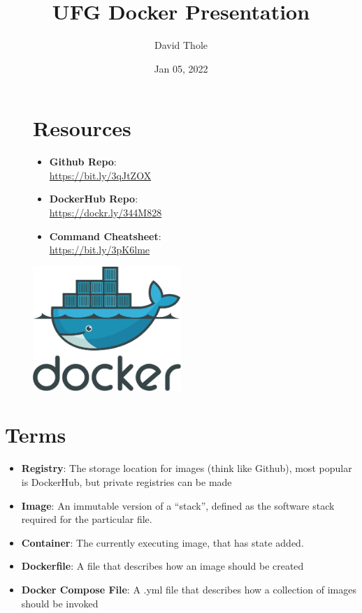 \documentclass[legal,12pt,oneside,pdflatex,final,twocolumn]{article}
\title{UFG Docker Presentation}
\author{David Thole}
\date{Jan 05, 2022}
\begin{document}
\pagestyle{fancy}


\onecolumn

\begin{figure}
\begin{minipage}{0.47\textwidth}
\section{Resources}
    \begin{itemize}
        \item \textbf{Github Repo}: \\ \url{https://bit.ly/3qJtZOX}
        \item \textbf{DockerHub Repo}: \\ \url{https://dockr.ly/344M828}
        \item \textbf{Command Cheatsheet}: \\ \url{https://bit.ly/3pK6lme}
    \end{itemize}
\end{minipage}
\hfill
\begin{minipage}{0.47\textwidth}
  \centering
  \includegraphics[width=0.5\textwidth,right]{XX-DockerLogo.png}
\end{minipage}
\end{figure}

\section{Terms}
\begin{itemize}
  \item \textbf{Registry}: The storage location for images (think like Github), most popular is DockerHub, but private registries can be made
  \item \textbf{Image}: An immutable version of a ``stack'', defined as the software stack required for the particular file.
  \item \textbf{Container}: The currently executing image, that has state added.
  \item \textbf{Dockerfile}: A file that describes how an image should be created
  \item \textbf{Docker Compose File}: A .yml file that describes how a collection of images should be invoked
\end{itemize}
\end{document}
